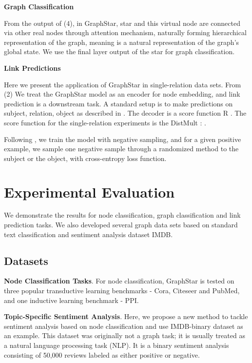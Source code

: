\documentclass{article}
\begin{document}
\textbf{Graph Classification}

From the output of (4), in GraphStar, star and this virtual node are connected via other real nodes through attention mechanism, naturally forming hierarchical representation of the graph, meaning  is a natural representation of the graph's global state. We use the final layer output of the star for graph classification.

\textbf{Link Predictions}

Here we present the application of GraphStar in single-relation data sets. From (2) We treat the GraphStar model as an encoder for node embedding, and link prediction is a downstream task. A standard setup is to make predictions on subject, relation, object  as described in \cite{schlichtkrull2018modeling}. The decoder is a score function   R . The score function for the single-relation experiments is the DistMult \cite{yang2014embedding}: .

Following  \cite{yang2014embedding, trouillon2016complex,schlichtkrull2018modeling}, we train the model with negative sampling, and for a given positive example, we sample one negative sample through a randomized method to the subject or the object, with cross-entropy loss function.

\section{Experimental Evaluation}

We demonstrate the results for node classification, graph classification and link prediction tasks. We also developed several graph data sets based on standard text classification and sentiment analysis dataset IMDB. 

\subsection{Datasets}

\textbf{Node Classification Tasks}. For node classification, GraphStar is tested on three popular transductive learning benchmarks - Cora, Citeseer and PubMed, and one inductive learning benchmark - PPI.

\textbf{Topic-Specific Sentiment Analysis}. Here, we propose a new method to tackle sentiment analysis based on node classification and use IMDB-binary dataset as an example. This dataset was originally not a graph task; it is usually treated as a natural language processing task (NLP). It is a binary sentiment analysis consisting of 50,000 reviews labeled as either positive or negative. 
\end{document}
